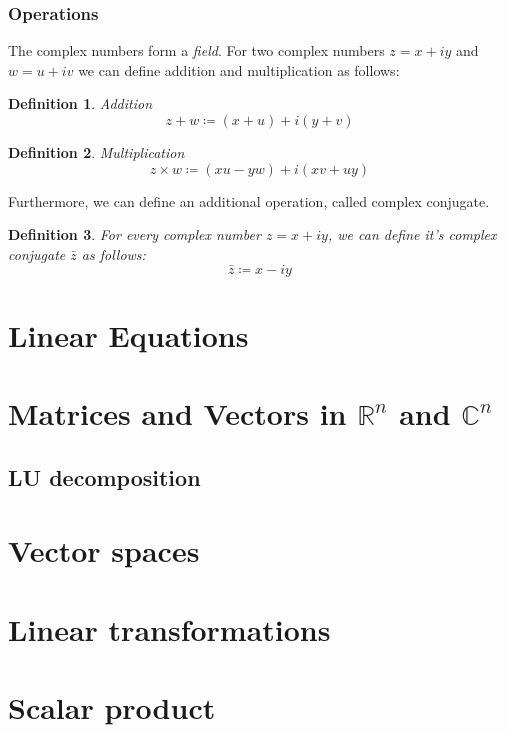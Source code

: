 \documentclass[a4paper,12pt]{article}
\newcommand{\uniti}{i}
\newcommand{\defas}{\coloneqq}
\newcommand{\conj}[1]{\bar{#1}}
\newcommand{\R}{\mathbb{R}}
\theoremstyle{plain}
\newtheorem{defn}{Definition}[section]
\numberwithin{equation}{section}
\begin{document}
\subsubsection{Operations}

The complex numbers form a \textit{field}. For two complex numbers
$ z = x + \uniti y $ and $ w = u + \uniti v $ we can define
addition and multiplication as follows:

\begin{defn} Addition
    $$ z + w \defas (x + u) + \uniti (y + v) $$
\end{defn}
\begin{defn} Multiplication
    $$ z \times w \defas (xu - yw) + \uniti (xv + uy) $$
\end{defn}

Furthermore, we can define an additional operation, called complex conjugate.

\begin{defn}
    For every complex number $z = x + \uniti y$,
    we can define it's complex conjugate $\conj{z}$ as follows:
    $$ \conj{z} \defas x - \uniti y $$
\end{defn}

\section{Linear Equations}

\section{Matrices and Vectors in $\R^{n}$ and $\mathbb{C}^{n}$}

\subsection{LU decomposition}

\section{Vector spaces}

\section{Linear transformations}

\section{Scalar product}
\end{document}
